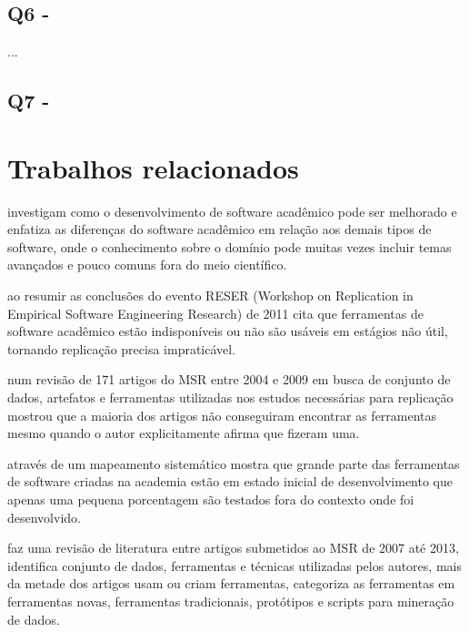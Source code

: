 \subsection{Q6 - \QuestaoSeis}

...

\subsection{Q7 - \QuestaoSete}


\section{Trabalhos relacionados}

investigam como o desenvolvimento de software acadêmico pode ser melhorado e
enfatiza as diferenças do software acadêmico em relação aos demais tipos de
software, onde o conhecimento sobre o domínio pode muitas vezes incluir temas
avançados e pouco comuns fora do meio científico.

ao resumir as conclusões do evento RESER (Workshop on Replication in Empirical
Software Engineering Research) de 2011 cita que ferramentas de software
acadêmico estão indisponíveis ou não são usáveis em estágios não útil, tornando
replicação precisa impraticável.

 num revisão de 171 artigos do MSR entre 2004 e 2009
em busca de conjunto de dados, artefatos e ferramentas utilizadas nos estudos
necessárias para replicação mostrou que a maioria dos artigos não conseguiram encontrar
as ferramentas mesmo quando o autor explicitamente afirma que fizeram uma.


através de um mapeamento sistemático mostra que grande parte das ferramentas de
software criadas na academia estão em estado inicial de desenvolvimento que
apenas uma pequena porcentagem são testados fora do contexto onde foi
desenvolvido. 

faz uma revisão de literatura entre artigos submetidos ao MSR de 2007 até 2013,
identifica conjunto de dados, ferramentas e técnicas utilizadas pelos autores,
mais da metade dos artigos usam ou criam ferramentas, categoriza as ferramentas
em ferramentas novas, ferramentas tradicionais, protótipos e scripts para
mineração de dados.

